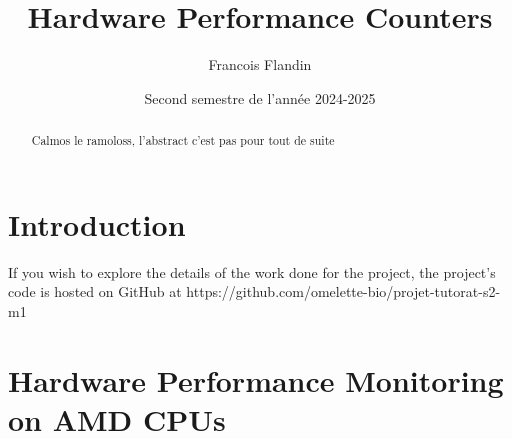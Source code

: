 \documentclass{rapport}
\title{Hardware Performance Counters}
\author{Francois Flandin}
\date{Second semestre de l'année 2024-2025}
\begin{document}
  \maketitle

  \begin{abstract}
    Calmos le ramoloss, l'abstract c'est pas pour tout de suite
  \end{abstract}

  \clearpage
  \tableofcontents
  \clearpage
  \section{Introduction}
  If you wish to explore the details of the work done for the project, the project's code is hosted on GitHub at https://github.com/omelette-bio/projet-tutorat-s2-m1

  \clearpage
    
  \section{Hardware Performance Monitoring on AMD CPUs}
\end{document}
